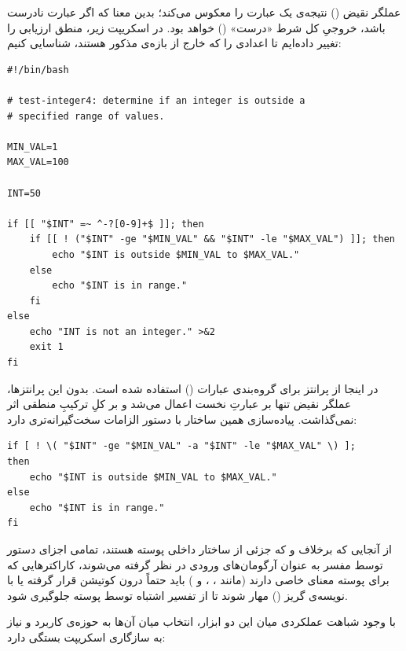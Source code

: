 عملگر نقیض (\cmd{!}) نتیجه‌ی یک عبارت را معکوس می‌کند؛ بدین معنا که اگر عبارت نادرست باشد، خروجیِ کل شرط «درست» () خواهد بود. در اسکریپت زیر، منطق ارزیابی را تغییر داده‌ایم تا اعدادی را که خارج از بازه‌ی مذکور هستند، شناسایی کنیم:

\begin{latin}
\begin{lstlisting}
#!/bin/bash

# test-integer4: determine if an integer is outside a
# specified range of values.

MIN_VAL=1
MAX_VAL=100

INT=50

if [[ "$INT" =~ ^-?[0-9]+$ ]]; then
    if [[ ! ("$INT" -ge "$MIN_VAL" && "$INT" -le "$MAX_VAL") ]]; then
        echo "$INT is outside $MIN_VAL to $MAX_VAL."
    else
        echo "$INT is in range."
    fi
else
    echo "INT is not an integer." >&2
    exit 1
fi
\end{lstlisting}
\end{latin}

در اینجا از پرانتز برای گروه‌بندی عبارات () استفاده شده است. بدون این پرانتزها، عملگر نقیض تنها بر عبارتِ نخست اعمال می‌شد و بر کلِ ترکیبِ منطقی اثر نمی‌گذاشت. پیاده‌سازی همین ساختار با دستور  الزامات سخت‌گیرانه‌تری دارد:

\begin{latin}
\begin{lstlisting}
if [ ! \( "$INT" -ge "$MIN_VAL" -a "$INT" -le "$MAX_VAL" \) ];
then
    echo "$INT is outside $MIN_VAL to $MAX_VAL."
else
    echo "$INT is in range."
fi
\end{lstlisting}
\end{latin}

از آنجایی که برخلاف \cmd{[[ ]]} و \cmd{(( ))} که جزئی از ساختار داخلی پوسته هستند، تمامی اجزای دستور  توسط مفسر  به عنوان آرگومان‌های ورودی در نظر گرفته می‌شوند، کاراکترهایی که برای پوسته معنای خاصی دارند (مانند \cmd{<}، \cmd{>}، \cmd{(} و \cmd{)}) باید حتماً درون کوتیشن قرار گرفته یا با نویسه‌ی گریز (\cmd{\textbackslash}) مهار شوند تا از تفسیر اشتباه توسط پوسته جلوگیری شود.

با وجود شباهت عملکردی میان این دو ابزار، انتخاب میان آن‌ها به حوزه‌ی کاربرد و نیاز به سازگاری اسکریپت بستگی دارد:

